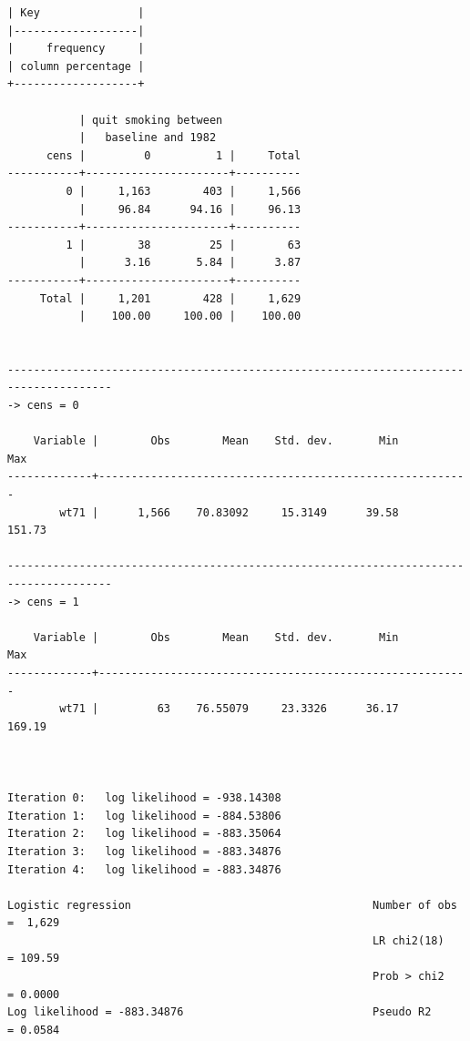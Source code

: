 \documentclass[
  10pt,
  a4paper,
]{book}
\begin{document}
\begin{verbatim}
| Key               |
|-------------------|
|     frequency     |
| column percentage |
+-------------------+

           | quit smoking between
           |   baseline and 1982
      cens |         0          1 |     Total
-----------+----------------------+----------
         0 |     1,163        403 |     1,566 
           |     96.84      94.16 |     96.13 
-----------+----------------------+----------
         1 |        38         25 |        63 
           |      3.16       5.84 |      3.87 
-----------+----------------------+----------
     Total |     1,201        428 |     1,629 
           |    100.00     100.00 |    100.00 


--------------------------------------------------------------------------------------
-> cens = 0

    Variable |        Obs        Mean    Std. dev.       Min        Max
-------------+---------------------------------------------------------
        wt71 |      1,566    70.83092     15.3149      39.58     151.73

--------------------------------------------------------------------------------------
-> cens = 1

    Variable |        Obs        Mean    Std. dev.       Min        Max
-------------+---------------------------------------------------------
        wt71 |         63    76.55079     23.3326      36.17     169.19



Iteration 0:   log likelihood = -938.14308  
Iteration 1:   log likelihood = -884.53806  
Iteration 2:   log likelihood = -883.35064  
Iteration 3:   log likelihood = -883.34876  
Iteration 4:   log likelihood = -883.34876  

Logistic regression                                     Number of obs =  1,629
                                                        LR chi2(18)   = 109.59
                                                        Prob > chi2   = 0.0000
Log likelihood = -883.34876                             Pseudo R2     = 0.0584


\end{verbatim}
\end{document}
